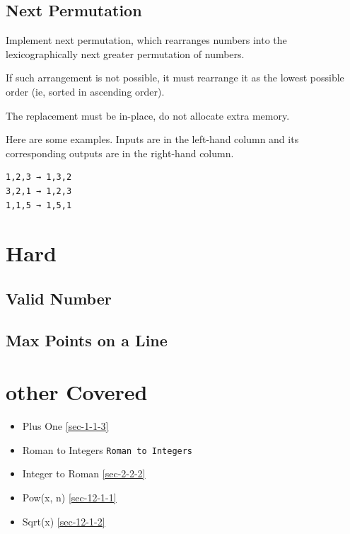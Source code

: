 \documentclass[12pt]{book}
\begin{document}
\subsection{Next Permutation}
\label{sec-21-2-5}
Implement next permutation, which rearranges numbers into the lexicographically next greater permutation of numbers.

If such arrangement is not possible, it must rearrange it as the lowest possible order (ie, sorted in ascending order).

The replacement must be in-place, do not allocate extra memory.

Here are some examples. Inputs are in the left-hand column and its
corresponding outputs are in the right-hand column.
\lstset{language=java,label= ,caption= ,numbers=none}
\begin{lstlisting}
1,2,3 → 1,3,2
3,2,1 → 1,2,3
1,1,5 → 1,5,1
\end{lstlisting}
\section{Hard}
\label{sec-21-3}
\subsection{Valid Number}
\label{sec-21-3-1}
\subsection{Max Points on a Line}
\label{sec-21-3-2}
\section{other Covered}
\label{sec-21-4}
\begin{itemize}
\item Plus One
\ref{sec-1-1-3}
\item Roman to Integers
\texttt{Roman to Integers}
\item Integer to Roman
\ref{sec-2-2-2}
\item Pow(x, n)
\ref{sec-12-1-1}
\item Sqrt(x)
\ref{sec-12-1-2}
\end{itemize}
\end{document}
